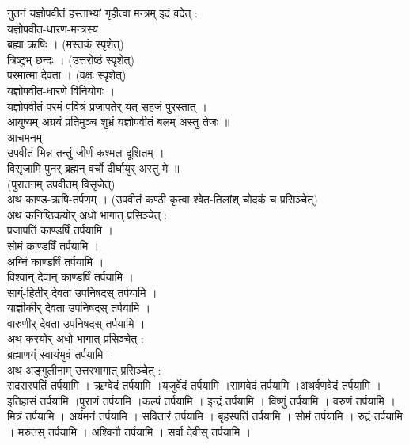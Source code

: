\documentclass[12pt]{article}
\begin{document}
{{{नुतनं यज्ञोपवीतं हस्ताभ्यां गृहीत्वा मन्त्रम् इदं वदेत् :\\

यज्ञोपवीत-धारण-मन्त्रस्य\\
ब्रह्मा ऋषिः । (मस्तकं स्पृशेत्)\\
त्रिष्टुभ् छन्दः । (उत्तरोष्ठं स्पृशेत्)\\
परमात्मा देवता । (वक्षः स्पृशेत्)\\
यज्ञोपवीत-धारणे विनियोगः ।\\

यज्ञोपवीतं परमं पवित्रं प्रजापतेर् यत् सहजं पुरस्तात् ।\\
आयुष्यम् अग्रयं प्रतिमुञ्च शुभ्रं यज्ञोपवीतं बलम् अस्तु तेजः ॥\\

आचमनम्\\

उपवीतं भिन्न-तन्तुं जीर्णं कश्मल-दूशितम् ।\\
विसृजामि पुनर् ब्रह्मन् वर्चो दीर्घायुर् अस्तु मे ॥\\
(पुरातनम् उपवीतम् विसृजेत्)\\

अथ काण्ड-ऋषि-तर्पणम् । (उपवीतं कण्ठी कृत्वा श्वेत-तिलांश् चोदकं च प्रसिञ्चेत्)\\

अथ कनिष्ठिकयोर् अधो भागात् प्रसिञ्चेत् :\\ 
प्रजापतिं काण्डर्षिं तर्पयामि ।\\
सोमं काण्डर्षिं तर्पयामि ।\\
अग्निं काण्डर्षिं तर्पयामि ।\\
विश्वान् देवान् काण्डर्षिं तर्पयामि ।\\
साग्ं-हितीर् देवता उपनिषदस् तर्पयामि ।\\
याज्ञीकीर् देवता उपनिषदस् तर्पयामि ।\\
वारुणीर् देवता उपनिषदस् तर्पयामि । \\

अथ करयोर् अधो भागात् प्रसिञ्चेत् :\\
ब्रह्माणग्ं स्वायंभुवं तर्पयामि ।\\

अथ अङ्गुलीनाम् उत्तरभागात् प्रसिञ्चेत् :\\
सदसस्पतिं तर्पयामि । ऋग्वेदं तर्पयामि ।यजुर्वेदं तर्पयामि ।सामवेदं तर्पयामि ।अथर्वणवेदं तर्पयामि । इतिहासं तर्पयामि ।पुराणं तर्पयामि ।कल्पं तर्पयामि ।
इन्द्रं तर्पयामि । विष्णुं तर्पयामि । वरुणं तर्पयामि । मित्रं तर्पयामि । अर्यमनं तर्पयामि । सवितारं तर्पयामि । बृहस्पतिं तर्पयामि । सोमं तर्पयामि । रुद्रं तर्पयामि । मरुतस् तर्पयामि । अश्विनौ तर्पयामि । सर्वा देवीस् तर्पयामि ।\\

}}}
\end{document}
